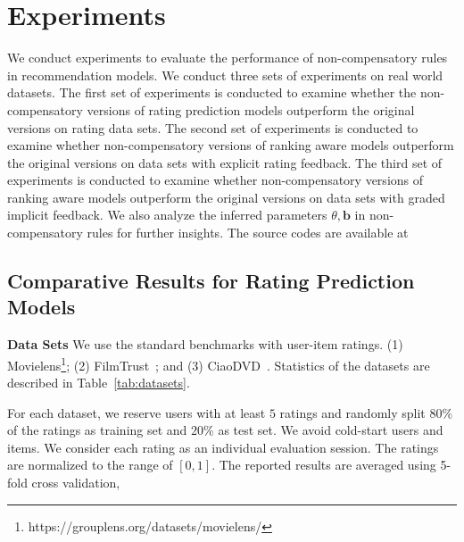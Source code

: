 \documentclass[letterpaper]{article} %
\begin{document}
\section{Experiments}\label{sec:experiment}
We conduct experiments to evaluate the performance of non-compensatory rules in recommendation models. We conduct three sets of experiments on real world datasets. The first set of experiments is conducted to examine whether the non-compensatory versions of rating prediction models outperform the original versions on rating data sets. 
The second set of experiments is conducted to examine whether non-compensatory versions of ranking aware models outperform the original versions on data sets with explicit rating feedback.
The third set of experiments is conducted to examine whether non-compensatory versions of ranking aware models outperform the original versions on data sets with graded implicit feedback. We also analyze the inferred parameters $\theta,\mathbf{b}$ in non-compensatory rules for further insights. The source codes are available at%

\subsection{Comparative Results for Rating Prediction Models}

\textbf{Data Sets} We use the standard benchmarks with user-item ratings. (1) Movielens\footnote{https://grouplens.org/datasets/movielens/}; (2) FilmTrust~\cite{Guo2013Novel}; and (3) CiaoDVD~\cite{Guo2014ETAF}. Statistics of the datasets are described in Table~\ref{tab:datasets}. 

For each dataset, we reserve users with at least $5$ ratings and randomly split $80\%$ of the ratings as training set and $20\%$ as test set. We avoid cold-start users and items. We consider each rating as an individual evaluation session. The ratings are normalized to the range of $[0,1]$. The reported results are averaged using 5-fold cross validation, 
\end{document}
